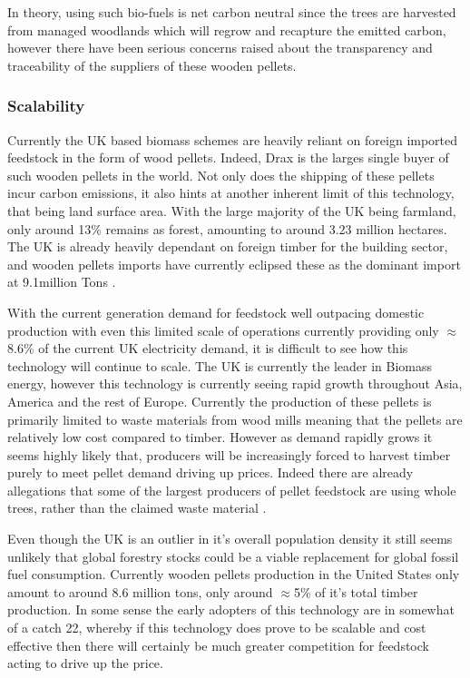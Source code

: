 \documentclass[11pt]{article}
\numberwithin{equation}{section}
\begin{document}
In theory, using such bio-fuels is net carbon neutral since the trees are harvested from managed woodlands which will regrow and recapture the emitted carbon, however there have been serious concerns raised about the transparency and traceability of the suppliers of these wooden pellets.

\subsubsection{Scalability}
\label{sec:org0f95d2b}
Currently the UK based biomass schemes are heavily reliant on foreign imported feedstock in the form of wood pellets. Indeed, Drax is the larges single buyer of such wooden pellets in the world. Not only does the shipping of these pellets incur carbon emissions, it also hints at another inherent limit of this technology, that being land surface area. With the large majority of the UK being farmland, only around 13\% remains as forest, amounting to around 3.23 million hectares. The UK is already heavily dependant on foreign timber for the building sector, and wooden pellets imports have currently eclipsed these as the dominant import at 9.1million Tons \cite{ForestResearch}.

With the current generation demand for feedstock well outpacing domestic production with even this limited scale of operations currently providing only \(\approx\)8.6\% of the current UK electricity demand, it is difficult to see how this technology will continue to scale. The UK is currently the leader in Biomass energy, however this technology is currently seeing rapid growth throughout Asia, America and the rest of Europe. Currently the production of these pellets is primarily limited to waste materials from wood mills meaning that the pellets are relatively low cost compared to timber. However as demand rapidly grows it seems highly likely that, producers will be increasingly forced to harvest timber purely to meet pellet demand driving up prices. Indeed there are already allegations that some of the largest producers of pellet feedstock are using whole trees, rather than the claimed waste material \cite{BioPelletsWholeTrees}.

Even though the UK is an outlier in it's overall population density it still seems unlikely that global forestry stocks could be a viable replacement for global fossil fuel consumption. Currently wooden pellets production in the United States only amount to around 8.6 million tons, only around \(\approx\)5\% of it's total timber production\cite{USTimberPoduction,UNForresteryDB}. In some sense the early adopters of this technology are in somewhat of a catch 22, whereby if this technology does prove to be scalable and cost effective then there will certainly be much greater competition for feedstock acting to drive up the price.
\end{document}
